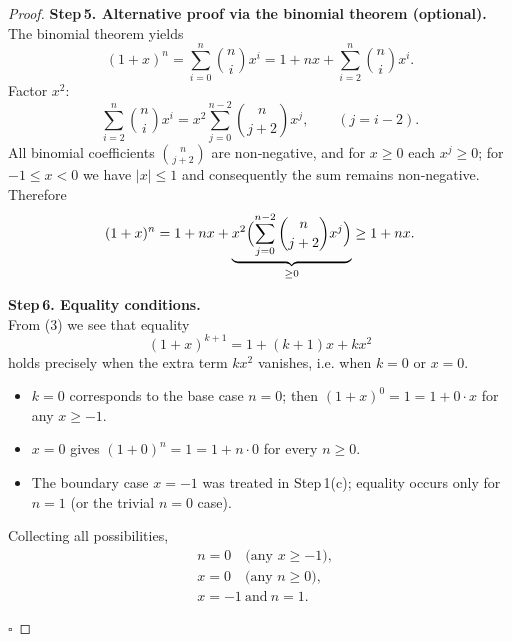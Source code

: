 \begin{proof}
\textbf{Step 5. Alternative proof via the binomial theorem (optional).}\\
The binomial theorem yields
\[
(1+x)^{n}= \sum_{i=0}^{n}\binom{n}{i}x^{i}
          =1+nx+\sum_{i=2}^{n}\binom{n}{i}x^{i}.
\]
Factor \(x^{2}\):
\[
\sum_{i=2}^{n}\binom{n}{i}x^{i}=x^{2}\sum_{j=0}^{n-2}\binom{n}{j+2}x^{j},
\qquad (j=i-2).
\]
All binomial coefficients \(\binom{n}{j+2}\) are non‑negative, and for \(x\ge0\) each \(x^{j}\ge0\); for \(-1\le x<0\) we have \(|x|\le1\) and consequently the sum remains non‑negative.  Therefore
\[
(1+x)^{n}=1+nx+\underbrace{x^{2}\Bigl(\sum_{j=0}^{n-2}\binom{n}{j+2}x^{j}\Bigr)}_{\ge0}
\ge1+nx.
\]

\textbf{Step 6. Equality conditions.}\\
From (3) we see that equality
\[
(1+x)^{k+1}=1+(k+1)x+kx^{2}
\]
holds precisely when the extra term \(kx^{2}\) vanishes, i.e. when \(k=0\) or \(x=0\).

\begin{itemize}
\item \(k=0\) corresponds to the base case \(n=0\); then \((1+x)^{0}=1=1+0\cdot x\) for any \(x\ge-1\).
\item \(x=0\) gives \((1+0)^{n}=1=1+n\cdot0\) for every \(n\ge0\).
\item The boundary case \(x=-1\) was treated in Step 1(c); equality occurs only for \(n=1\) (or the trivial \(n=0\) case).
\end{itemize}
Collecting all possibilities,
\[
\boxed{
\begin{aligned}
&n=0\quad\text{(any }x\ge-1),\\
&x=0\quad\text{(any }n\ge0),\\
&x=-1\ \text{and}\ n=1 .
\end{aligned}}
\]

\(\square\)
\end{proof}